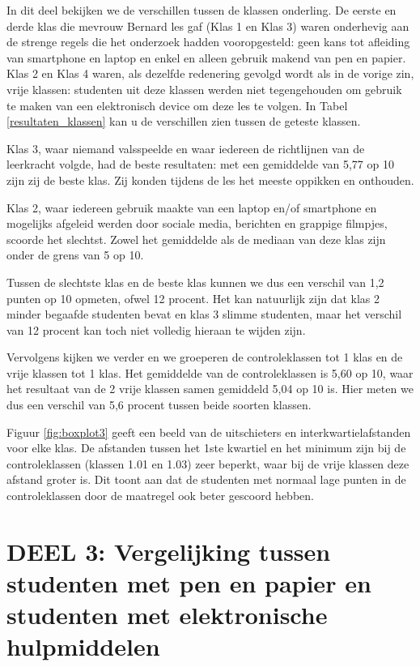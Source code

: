 In dit deel bekijken we de verschillen tussen de klassen onderling. De eerste en derde klas die mevrouw Bernard les gaf (Klas 1 en Klas 3) waren onderhevig aan de strenge regels die het onderzoek hadden vooropgesteld: geen kans tot afleiding van smartphone en laptop en enkel en alleen gebruik makend van pen en papier. Klas 2 en Klas 4 waren, als dezelfde redenering gevolgd wordt als in de vorige zin, vrije klassen: studenten uit deze klassen werden niet tegengehouden om gebruik te maken van een elektronisch device om deze les te volgen. In Tabel \ref{resultaten_klassen} kan u de verschillen zien tussen de geteste klassen.

Klas 3, waar niemand valsspeelde en waar iedereen de richtlijnen van de leerkracht volgde, had de beste resultaten: met een gemiddelde van 5,77 op 10 zijn zij de beste klas. Zij konden tijdens de les het meeste oppikken en onthouden.

Klas 2, waar iedereen gebruik maakte van een laptop en/of smartphone en mogelijks afgeleid werden door sociale media, berichten en grappige filmpjes, scoorde het slechtst. Zowel het gemiddelde als de mediaan van deze klas zijn onder de grens van 5 op 10.

Tussen de slechtste klas en de beste klas kunnen we dus een verschil van 1,2 punten op 10 opmeten, ofwel 12 procent. Het kan natuurlijk zijn dat klas 2 minder begaafde studenten bevat en klas 3 slimme studenten, maar het verschil van 12 procent kan toch niet volledig hieraan te wijden zijn.

Vervolgens kijken we verder en we groeperen de controleklassen tot 1 klas en de vrije klassen tot 1 klas. Het gemiddelde van de controleklassen is 5,60 op 10, waar het resultaat van de 2 vrije klassen samen gemiddeld 5,04 op 10 is. Hier meten we dus een verschil van 5,6 procent tussen beide soorten klassen.

Figuur \ref{fig:boxplot3} geeft een beeld van de uitschieters en interkwartielafstanden voor elke klas. De afstanden tussen het 1ste kwartiel en het minimum zijn bij de controleklassen (klassen 1.01 en 1.03) zeer beperkt, waar bij de vrije klassen deze afstand groter is. Dit toont aan dat de studenten met normaal lage punten in de controleklassen door de maatregel ook beter gescoord hebben. 


\section{DEEL 3: Vergelijking tussen studenten met pen en papier en studenten met elektronische hulpmiddelen}
\label{sec:vragen_res3}

